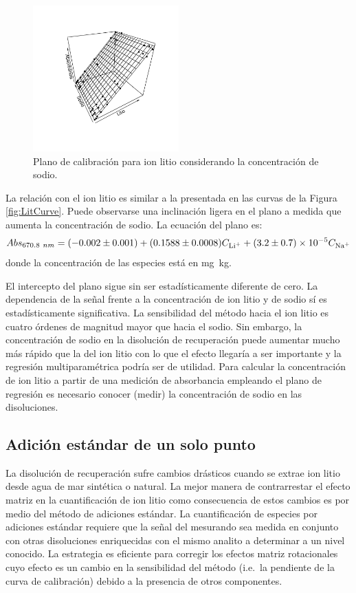 \begin{figure}[H]
    \centering
    \includegraphics[width=0.5\textwidth, trim={3cm 2.5cm 2.05cm 2.3cm}, clip]{App/images/LiPlane.pdf}
    \caption{Plano de calibración para ion litio considerando la concentración de sodio.}
    \label{fig:planarLit}
\end{figure}
\clearpage La relación con el ion litio es similar a la presentada en las curvas de la Figura \ref{fig:LitCurve}. Puede observarse una inclinación ligera en el plano a medida que aumenta la concentración de sodio. La ecuación del plano es:
\begin{equation}\label{eq:litPlan}
    Abs_{670.8~nm}=(-0.002\pm0.001)+(0.1588\pm0.0008) C_{\ce{Li^+}}+(3.2\pm0.7)\e{-5} C_{\ce{Na^+}}
\end{equation}
donde la concentración de las especies está en mg~kg\mnn. 

El intercepto del plano sigue sin ser estadísticamente diferente de cero. La dependencia de la señal frente a la concentración de ion litio y de sodio sí es estadísticamente significativa. La sensibilidad del método hacia el ion litio es cuatro órdenes de magnitud mayor que hacia el sodio. Sin embargo, la concentración de sodio en la disolución de recuperación puede aumentar mucho más rápido que la del ion litio con lo que el efecto llegaría a ser importante y la regresión multiparamétrica podría ser de utilidad. Para calcular la concentración de ion litio a partir de una medición de absorbancia empleando el plano de regresión es necesario conocer (medir) la concentración de sodio en las disoluciones. 

\subsection{Adición estándar de un solo punto}
La disolución de recuperación sufre cambios drásticos cuando se extrae ion litio desde agua de mar sintética o natural. La mejor manera de contrarrestar el efecto matriz en la cuantificación de ion litio como consecuencia de estos cambios es por medio del método de adiciones estándar. La cuantificación de especies por adiciones estándar requiere que la señal del mesurando sea medida en conjunto con otras disoluciones enriquecidas con el mismo analito a determinar a un nivel conocido. La estrategia es eficiente para corregir los efectos matriz rotacionales cuyo efecto es un cambio en la sensibilidad del método (i.e.\ la pendiente de la curva de calibración) debido a la presencia de otros componentes.

